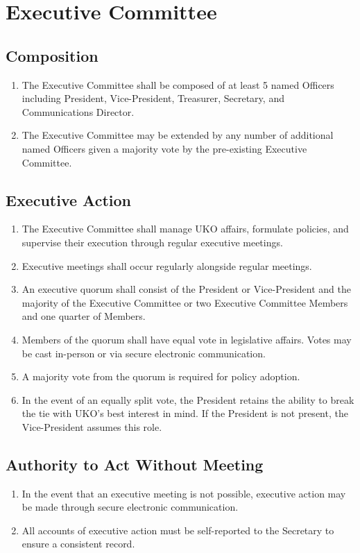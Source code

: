 \documentclass[12pt,executivepaper]{article}
\begin{document}
\section{Executive Committee}

\subsection{Composition}
\begin{enumerate}
    \item The Executive Committee shall be composed of at least 5 named
          Officers including President, Vice-President, Treasurer, Secretary,
          and Communications Director.
    \item The Executive Committee may be extended by any number of additional
          named Officers given a majority vote by the pre-existing Executive
          Committee.
\end{enumerate}

\subsection{Executive Action}
\begin{enumerate}
    \item The Executive Committee shall manage UKO affairs, formulate policies,
          and supervise their execution through regular executive meetings.
    \item Executive meetings shall occur regularly alongside regular meetings.
    \item An executive quorum shall consist of the President or Vice-President
          and the majority of the Executive Committee or two Executive
          Committee Members and one quarter of Members.
    \item Members of the quorum shall have equal vote in legislative affairs.
          Votes may be cast in-person or via secure electronic communication.
    \item A majority vote from the quorum is required for policy adoption.
    \item In the event of an equally split vote, the President retains the
          ability to break the tie with UKO's best interest in mind. If the
          President is not present, the Vice-President assumes this role.
\end{enumerate}

\subsection{Authority to Act Without Meeting}
\begin{enumerate}
    \item In the event that an executive meeting is not possible, executive
          action may be made through secure electronic communication.
    \item All accounts of executive action must be self-reported to the
          Secretary to ensure a consistent record.
\end{enumerate}
\end{document}

